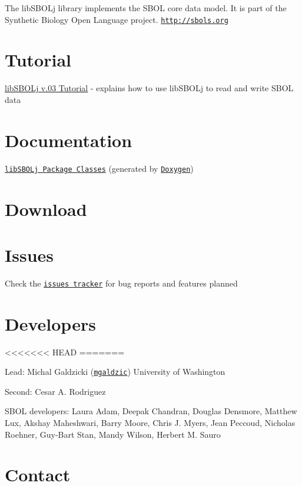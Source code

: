 The libSBOLj library implements the SBOL core data model. It is part of the Synthetic Biology Open Language project. \href{http://sbols.org}{\tt http://sbols.org} \hypertarget{index_tutorial_sec}{}\section{Tutorial}\label{index_tutorial_sec}

\begin{DoxyItemize}
\item \hyperlink{tutorial}{libSBOLj v.03 Tutorial} -\/ explains how to use libSBOLj to read and write SBOL data
\end{DoxyItemize}\hypertarget{index_doc_sec}{}\section{Documentation}\label{index_doc_sec}

\begin{DoxyItemize}
\item \href{annotated.html}{\tt libSBOLj Package Classes} (generated by \href{http://www.stack.nl/~dimitri/doxygen/}{\tt Doxygen})
\end{DoxyItemize}\hypertarget{index_download_sec}{}\section{Download}\label{index_download_sec}
\hypertarget{index_issues_sec}{}\section{Issues}\label{index_issues_sec}

\begin{DoxyItemize}
\item Check the \href{https://github.com/mgaldzic/libSBOLj/issues}{\tt issues tracker} for bug reports and features planned
\end{DoxyItemize}\hypertarget{index_author_sec}{}\section{Developers}\label{index_author_sec}

\begin{DoxyItemize}
<<<<<<< HEAD
=======
\item Lead: Michal Galdzicki (\href{http://github.com/mgaldzic}{\tt mgaldzic}) University of Washington
\item Second: Cesar A. Rodriguez
\item SBOL developers: Laura Adam, Deepak Chandran, Douglas Densmore, Matthew Lux, Akshay Maheshwari, Barry Moore, Chris J. Myers, Jean Peccoud, Nicholas Roehner, Guy-\/Bart Stan, Mandy Wilson, Herbert M. Sauro
\end{DoxyItemize}\hypertarget{index_contact_sec}{}\section{Contact}\label{index_contact_sec}

